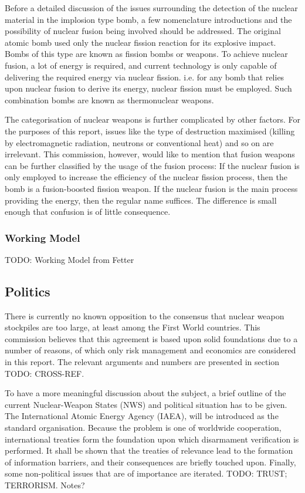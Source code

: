 \documentclass[twoside,titlepage,11pt,twocolumn,a4paper]{article}
\begin{document}
Before a detailed discussion of the issues surrounding the detection
of the nuclear material in the implosion type bomb, a few
nomenclature introductions and the possibility of nuclear fusion being
involved should be addressed. The original atomic bomb used only the
nuclear fission reaction for its explosive impact. Bombs of this type
are known as fission bombs or weapons. To achieve nuclear fusion, a
lot of energy is required, and current technology is only capable of
delivering the required energy via nuclear fission. i.e. for any bomb
that relies upon nuclear fusion to derive its energy, nuclear fission
must be employed. Such combination bombs are known as thermonuclear
weapons.

The categorisation of nuclear weapons is further complicated by other
factors. For the purposes of this report, issues like the type of
destruction maximised (killing by electromagnetic radiation, neutrons
or conventional heat) and so on are irrelevant. This commission,
however, would like to mention that fusion weapons can be further
classified by the usage of the fusion process: If the nuclear fusion
is only employed to increase the efficiency of the nuclear fission
process, then the bomb is a fusion-boosted fission weapon. If the
nuclear fusion is the main process providing the energy, then the
regular name suffices. The difference is small enough that confusion
is of little consequence.

\subsubsection{Working Model}
TODO: Working Model from Fetter
\subsection{Politics}
There is currently no known opposition to the consensus that nuclear
weapon stockpiles are too large, at least among the First World
countries. This commission believes that this agreement is based upon
solid foundations due to a number of reasons, of which only risk
management and economics are considered in this report. The relevant
arguments and numbers are presented in section TODO: CROSS-REF. 

To have a more meaningful discussion about the subject, a brief
outline of the current Nuclear-Weapon States (NWS) and political
situation has to be given. The International Atomic Energy Agency
(IAEA), will be introduced as the standard organisation. Because the
problem is one of worldwide cooperation, international treaties form
the foundation upon which disarmament verification is performed. It
shall be shown that the treaties of relevance lead to the formation of
information barriers, and their consequences are briefly touched
upon. Finally, some non-political issues that are of importance are
iterated. TODO: TRUST; TERRORISM. Notes?
\end{document}
